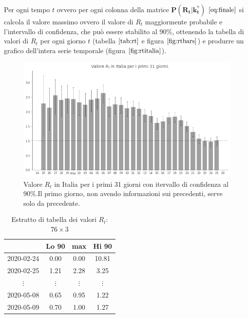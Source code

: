\documentclass[11pt]{article}
\begin{document}
    
    Per ogni tempo \(t\) ovvero per ogni colonna della matrice
\(\mathbf{{P(R_t|k_t^*)}}\) \(\eqref{eq:finale}\) si calcola il valore
massimo ovvero il valore di \(R_t\) maggiormente probabile e
l'intervallo di confidenza, che può essere stabilito al 90\%, ottenendo
la tabella di valori di \(R_t\) per ogni giorno \(t\) (tabella
\(\ref{tab:rt}\) e figura \(\ref{fig:rtbars}\)) e produrre un grafico
dell'intera serie temporale (figura \(\ref{fig:rtitalia}\)).

    
    \begin{figure}
    \centering
        \includegraphics{rtbars.png}
        \caption{Valore $R_t$ in Italia per i primi 31 giorni con itervallo di confidenza al 90\%.Il primo giorno, non avendo informazioni sui precedenti, serve solo da precedente.}
        \label{fig:rtbars}
    \end{figure}

    
    
\begin{table}
  \begin{center}
    \caption{Estratto di tabella dei valori $R_t$: $76 \times 3$}
    \label{tab:rt}
    \begin{tabular}{c|c|c|c|}
        & Lo 90 & max & Hi 90 \\
        \toprule
        2020-02-24 & 0.00 & 0.00 & 10.81 \\
        \midrule
        2020-02-25 & 1.21 & 2.28 & 3.25 \\
        \midrule
        $\vdots$ & $\vdots$ & $\vdots$ & $\vdots$ \\
        \midrule
        2020-05-08 & 0.65 & 0.95 & 1.22 \\
        \midrule
        2020-05-09 & 0.70 & 1.00 & 1.27 \\
        \bottomrule
    \end{tabular}
  \end{center}
\end{table}
        
\end{document}
